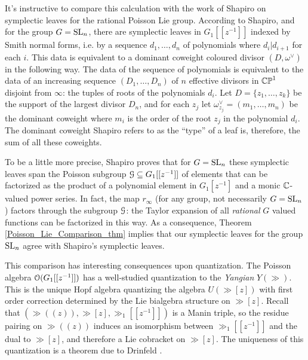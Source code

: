 \documentclass[10pt, oneside]{article}
\begin{document}
\begin{remark} \label{shapiro_leaves_remark}
It's instructive to compare this calculation with the work of Shapiro \cite{Shapiro} on symplectic leaves for the rational Poisson Lie group.  According to Shapiro, and for the group $G = \mathrm{SL}_n$, there are symplectic leaves in $G_1[[z^{-1}]]$ indexed by Smith normal forms, i.e. by a sequence $d_1, \ldots, d_n$ of polynomials where $d_i | d_{i+1}$ for each $i$.  This data is equivalent to a dominant coweight coloured divisor $(D,\omega^\vee)$ in the following way.  The data of the sequence of polynomials is equivalent to the data of an increasing sequence $(D_1, \ldots, D_n)$ of $n$ effective divisors in $\mathbb{CP}^1$ disjoint from $\infty$: the tuples of roots of the polynomials $d_i$.  Let $D = \{z_1, \ldots, z_k\}$ be the support of the largest divisor $D_n$, and for each $z_j$ let $\omega^\vee_{z_j} = (m_1, \ldots, m_n)$ be the dominant coweight where $m_i$ is the order of the root $z_j$ in the polynomial $d_i$.  The dominant coweight Shapiro refers to as the ``type'' of a leaf is, therefore, the sum of all these coweights.

To be a little more precise, Shapiro proves that for $G = \mathrm{SL}_n$ these symplectic leaves span the Poisson subgroup $\mathcal{G} \subseteq G_1[[z^{-1}]]$ of elements that can be factorized as the product of a polynomial element in $G_1[z^{-1}]$ and a monic $\mathbb{C}$-valued power series.  In fact, the map $r_\infty$ (for any group, not necessarily $G = \mathrm{SL}_n$) factors through the subgroup $\mathcal{G}$: the Taylor expansion of all \emph{rational} $G$ valued functions can be factorized in this way.  As a consequence, Theorem \ref{Poisson_Lie_Comparison_thm} implies that our symplectic leaves for the group $\mathrm{SL}_n$ agree with Shapiro's symplectic leaves.
\end{remark}

This comparison has interesting consequences upon quantization.  The Poisson algebra $\mathcal{O}(G_1[[z^{-1}]])$ has a well-studied quantization to the \emph{Yangian} $Y(\gg)$.  This is the unique Hopf algebra quantizing the algebra $U(\gg[z])$ with first order correction determined by the Lie bialgebra structure on $\gg[z]$.  Recall that $(\gg(\!(z)\!), \gg[z], \gg_1[[z^{-1}]])$ is a Manin triple, so the residue pairing on $\gg(\!(z)\!)$ induces an isomorphism between $\gg_1[[z^{-1}]]$ and the dual to $\gg[z]$, and therefore a Lie cobracket on $\gg[z]$.  The uniqueness of this quantization is a theorem due to Drinfeld {\cite[Theorem 2]{DrinfeldQuantum1}}.
\end{document}
